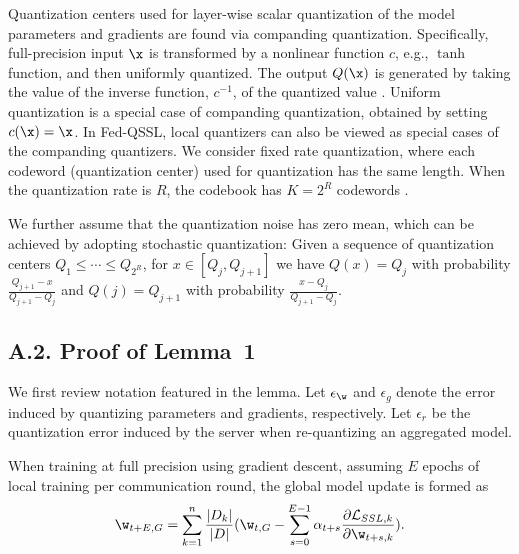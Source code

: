 \documentclass[a4paper,11pt]{article}
\begin{document}
Quantization centers used for layer-wise scalar quantization of the model parameters and gradients are found via companding quantization. Specifically, full-precision input $\x$ is transformed by a nonlinear function $c$, e.g., $\tanh$ function, and then uniformly quantized. The output $Q(\x)$ is generated by taking the value of the inverse function, $c^{-1}$, of the quantized value \cite{sun2011scalar}. Uniform quantization is  a special case of companding quantization, obtained by setting $c(\x) = \x$. In Fed-QSSL, local quantizers can also be viewed as special cases of the companding quantizers. We consider fixed rate quantization, where each codeword (quantization center) used for quantization has the same length. When the quantization rate is $R$, the codebook has $K = 2^R$ codewords \cite{sun2011scalar}. 

We further assume that the quantization noise has zero mean, which can be achieved by adopting stochastic quantization: Given a sequence of quantization centers $Q_1 \leq \cdots \leq Q_{2^R}$, for $x \in [Q_j, Q_{j+1}]$ we have $Q(x) = Q_j$ with probability $\frac{Q_{j+1} - x}{Q_{j+1} - Q_j}$ and $Q(j) = Q_{j+1}$ with probability $\frac{x - Q_{j}}{Q_{j+1} - Q_j}$. 


    \subsection*{A.2. Proof of Lemma~1}
    We first review notation featured in the lemma. 
Let $\epsilon_{\w}$ and $\epsilon_g$ denote the error induced by quantizing parameters and gradients, respectively. Let $\epsilon_r$ be the quantization error induced by the server when re-quantizing an aggregated model. 

When training at full precision using gradient descent, assuming $E$ epochs of local training per communication round, the global model update is formed as
\begin{align*}
    \w_{t+E, G} = \sum_{k=1}^n \frac{|D_k|}{|D|}(\w_{t, G} - \sum_{s = 0}^{E-1} \alpha_{t+s} \frac{\partial \mathcal{L}_{SSL, k}}{\partial \w_{t+s, k}}).
\end{align*}
\end{document}
